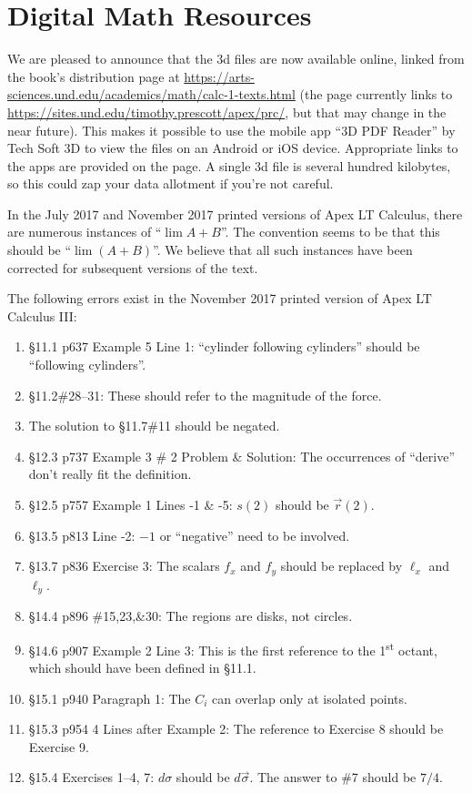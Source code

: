\documentclass{amsart}
\begin{document}
\section*{Digital Math Resources}

We are pleased to announce that the 3d files are now available online, linked from the book's distribution page at \url{https://arts-sciences.und.edu/academics/math/calc-1-texts.html} (the page currently links to \url{https://sites.und.edu/timothy.prescott/apex/prc/}, but that may change in the near future).  This makes it possible to use the mobile app ``3D PDF Reader'' by Tech Soft 3D to view the files on an Android or iOS device.  Appropriate links to the apps are provided on the page.  A single 3d file is several hundred kilobytes, so this could zap your data allotment if you're not careful.



In the July 2017 and November 2017 printed versions of Apex LT Calculus, there are numerous instances of ``$\lim A+B$''.  The convention seems to be that this should be ``$\lim(A+B)$''.  We believe that all such instances have been corrected for subsequent versions of the text.\bigskip

The following errors exist in the November 2017 printed version of Apex LT Calculus III:
\begin{enumerate}
\item \S11.1 p637 Example 5 Line 1: ``cylinder following cylinders'' should be ``following cylinders''.
\item \S11.2\#28--31: These should refer to the magnitude of the force.
\item The solution to \S11.7\#11 should be negated.
\item \S12.3 p737 Example 3 \# 2 Problem \& Solution: The occurrences of ``derive'' don't really fit the definition.
\item \S12.5 p757 Example 1 Lines -1 \& -5: $s(2)$ should be $\vec r(2)$.
\item \S13.5 p813 Line -2: $-1$ or ``negative'' need to be involved.
\item \S13.7 p836 Exercise 3: The scalars $f_x$ and $f_y$ should be replaced by $\ell_x$ and $\ell_y$.
\item \S14.4 p896 \#15,23,\&30: The regions are disks, not circles.
\item \S14.6 p907 Example 2 Line 3: This is the first reference to the 1\textsuperscript{st} octant, which should have been defined in \S11.1.
\item \S15.1 p940 Paragraph 1: The $C_i$ can overlap only at isolated points.
\item \S15.3 p954 4 Lines after Example 2: The reference to Exercise 8 should be Exercise 9.
\item \S15.4 Exercises 1--4, 7: $d\sigma$ should be $d\vec\sigma$.  The answer to \#7 should be $7/4$.
\label{2017-11IIIplus}
\end{enumerate}\vspace{1in}
\end{document}
